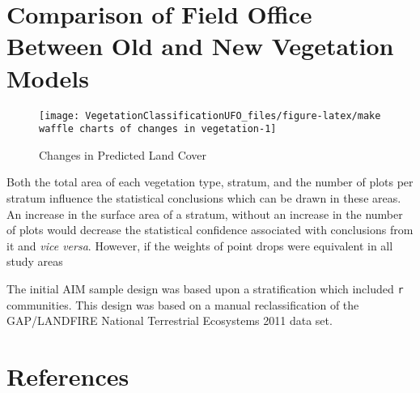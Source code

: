 \documentclass[
]{article}
\begin{document}
\hypertarget{comparison-of-field-office-between-old-and-new-vegetation-models}{%
\section{Comparison of Field Office Between Old and New Vegetation
Models}\label{comparison-of-field-office-between-old-and-new-vegetation-models}}

\begin{figure}
\texttt{[image: VegetationClassificationUFO\_files/figure-latex/make waffle charts of changes in vegetation-1]} \caption{Changes in Predicted Land Cover}\label{fig:make waffle charts of changes in vegetation}
\end{figure}

Both the total area of each vegetation type, stratum, and the number of
plots per stratum influence the statistical conclusions which can be
drawn in these areas. An increase in the surface area of a stratum,
without an increase in the number of plots would decrease the
statistical confidence associated with conclusions from it and
\emph{vice versa}. However, if the weights of point drops were
equivalent in all study areas

The initial AIM sample design was based upon a stratification which
included \texttt{r} communities. This design was based on a manual
reclassification of the GAP/LANDFIRE National Terrestrial Ecosystems
2011 data set.

\hypertarget{references}{%
\section{References}\label{references}}
\end{document}
